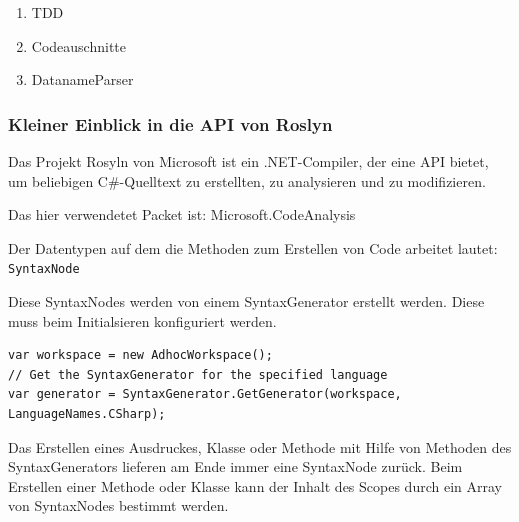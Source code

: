 \begin{enumerate}
	\begin{verbatim}
	TODO
	\end{verbatim}
	
	
	(Fussnote)
	Das vorhandensein von einem Inputstream und einem Outputstream bedeutet nicht zwingend , dass für jeden Input auch ein
	Output erzeugt wird. Die Notation unterscheidet beide Fälle nicht. 
	Deswegen die Lösung über eine Vergabe eines Actionames als Kompromiss.
	Wenn der Benutzer ein Actioname angibt, wird indirekt davon ausgegangen,
	das die Inputs- und Outputstreams nicht übereinstimmen, anderseits wird
	davon ausgegangen (Dieses Verhalten muss dem Benutzer bewusst sein).
	
	Ob dieses Entscheidung richtig ist müsste  noch in der Praxis erprobt werden. Stellt sich heraus,
	dass das schlecht ist, so müsste man über eine Anpassung der Notation
	nachdenken.
	
	
	
	\item TDD
	\label{sec:orgheadline38}
	
	\item Codeauschnitte
	\label{sec:orgheadline39}
	
	\item DatanameParser
	\label{sec:orgheadline40}
\end{enumerate}
\subsubsection{Kleiner Einblick in die API von Roslyn}
\label{sec:orgheadline43}
Das Projekt Rosyln von Microsoft ist ein .NET-Compiler, der eine API bietet, um beliebigen C\#-Quelltext zu erstellten,
zu analysieren und zu modifizieren.

Das hier verwendetet Packet ist: Microsoft.CodeAnalysis

Der Datentypen auf dem die Methoden zum Erstellen von Code arbeitet lautet:
\texttt{SyntaxNode} 

Diese SyntaxNodes werden von einem SyntaxGenerator erstellt werden.
Diese muss beim Initialsieren konfiguriert werden.

\begin{verbatim}
var workspace = new AdhocWorkspace();
// Get the SyntaxGenerator for the specified language
var generator = SyntaxGenerator.GetGenerator(workspace, LanguageNames.CSharp);
\end{verbatim}


Das Erstellen eines Ausdruckes, Klasse oder Methode mit Hilfe von Methoden
des SyntaxGenerators lieferen am Ende immer eine SyntaxNode zurück.
Beim Erstellen einer Methode oder Klasse kann der Inhalt des Scopes durch
ein Array von SyntaxNodes bestimmt werden.


